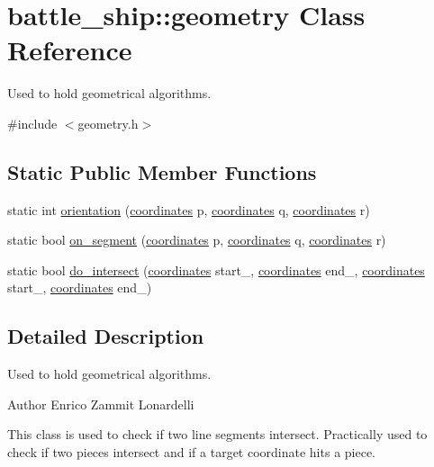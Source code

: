\hypertarget{classbattle__ship_1_1geometry}{}\section{battle\+\_\+ship\+:\+:geometry Class Reference}
\label{classbattle__ship_1_1geometry}


Used to hold geometrical algorithms.  




{\ttfamily \#include $<$geometry.\+h$>$}

\subsection*{Static Public Member Functions}
\begin{DoxyCompactItemize}
\item 
static int \hyperlink{classbattle__ship_1_1geometry_a319941076b65116cfb1ab1f636fb9b20}{orientation} (\hyperlink{structbattle__ship_1_1coordinates}{coordinates} p, \hyperlink{structbattle__ship_1_1coordinates}{coordinates} q, \hyperlink{structbattle__ship_1_1coordinates}{coordinates} r)
\item 
static bool \hyperlink{classbattle__ship_1_1geometry_a69fccbb7267eb16930041fbdfeb1064a}{on\+\_\+segment} (\hyperlink{structbattle__ship_1_1coordinates}{coordinates} p, \hyperlink{structbattle__ship_1_1coordinates}{coordinates} q, \hyperlink{structbattle__ship_1_1coordinates}{coordinates} r)
\item 
static bool \hyperlink{classbattle__ship_1_1geometry_a5415f69950638f0c84652b40d38e7ebd}{do\+\_\+intersect} (\hyperlink{structbattle__ship_1_1coordinates}{coordinates} start\+\_, \hyperlink{structbattle__ship_1_1coordinates}{coordinates} end\+\_, \hyperlink{structbattle__ship_1_1coordinates}{coordinates} start\+\_, \hyperlink{structbattle__ship_1_1coordinates}{coordinates} end\+\_)
\end{DoxyCompactItemize}


\subsection{Detailed Description}
Used to hold geometrical algorithms. 

\begin{DoxyAuthor}{Author}
Enrico Zammit Lonardelli
\end{DoxyAuthor}
This class is used to check if two line segments intersect. Practically used to check if two pieces intersect and if a target coordinate hits a piece.

